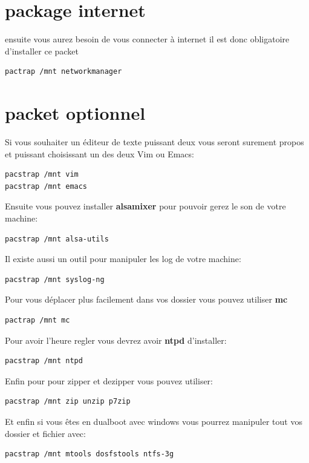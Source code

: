 \documentclass[a4paper]{book}
\begin{document}
\section{package internet}
ensuite vous aurez besoin de vous connecter à internet il est donc obligatoire
d'installer ce packet
\begin{verbatim}
pactrap /mnt networkmanager
\end{verbatim}
\section{packet optionnel}
Si vous souhaiter un éditeur de texte puissant deux vous seront surement propos
et puissant choisissant un des deux Vim ou Emacs\@:
\begin{verbatim}
pacstrap /mnt vim
pacstrap /mnt emacs
\end{verbatim}
Ensuite vous pouvez installer \textbf{alsamixer} pour pouvoir gerez le son de
votre machine\@:
\begin{verbatim}
pacstrap /mnt alsa-utils
\end{verbatim}
Il existe aussi un outil pour manipuler les log de votre machine\@:
\begin{verbatim}
pacstrap /mnt syslog-ng
\end{verbatim}
Pour vous déplacer plus facilement dans vos dossier vous pouvez utiliser
\textbf{mc}
\begin{verbatim}
pactrap /mnt mc
\end{verbatim}
Pour avoir l'heure regler vous devrez avoir \textbf{ntpd} d'installer\@:
\begin{verbatim}
pacstrap /mnt ntpd
\end{verbatim}
Enfin pour pour zipper et dezipper vous pouvez utiliser\@:
\begin{verbatim}
pacstrap /mnt zip unzip p7zip
\end{verbatim}
Et enfin si vous êtes en dualboot avec windows vous pourrez manipuler tout vos
dossier et fichier avec\@:
\begin{verbatim}
pacstrap /mnt mtools dosfstools ntfs-3g
\end{verbatim}
\end{document}
